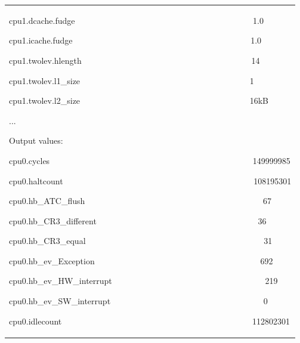\documentclass[a4paper]{article}
\begin{document}
\begin{flushleft}
\begin{tiny}
\begin{supertabular}{|m{6.34626in}|}
{\ttfamily cpu1.dcache.fudge
\ \ \ \ \ \ \ \ \ \ \ \ \ \ \ \ \ \ \ \ \ \ \ \ \ \ \ \ \ \ \ \ \ \ \ \ \ \ \ \ \ \ 1.0}

{\ttfamily cpu1.icache.fudge
\ \ \ \ \ \ \ \ \ \ \ \ \ \ \ \ \ \ \ \ \ \ \ \ \ \ \ \ \ \ \ \ \ \ \ \ \ \ \ \ \ \ 1.0}

{\ttfamily cpu1.twolev.hlength
\ \ \ \ \ \ \ \ \ \ \ \ \ \ \ \ \ \ \ \ \ \ \ \ \ \ \ \ \ \ \ \ \ \ \ \ \ \ \ \ 14}

{\ttfamily cpu1.twolev.l1\_size
\ \ \ \ \ \ \ \ \ \ \ \ \ \ \ \ \ \ \ \ \ \ \ \ \ \ \ \ \ \ \ \ \ \ \ \ \ \ \ \ 1}

{\ttfamily cpu1.twolev.l2\_size
\ \ \ \ \ \ \ \ \ \ \ \ \ \ \ \ \ \ \ \ \ \ \ \ \ \ \ \ \ \ \ \ \ \ \ \ \ \ \ \ 16kB}

{\ttfamily ...}

{\ttfamily Output values:}

{\ttfamily cpu0.cycles
\ \ \ \ \ \ \ \ \ \ \ \ \ \ \ \ \ \ \ \ \ \ \ \ \ \ \ \ \ \ \ \ \ \ \ \ \ \ \ \ \ \ \ \ \ \ \ \ 149999985}

{\ttfamily cpu0.haltcount
\ \ \ \ \ \ \ \ \ \ \ \ \ \ \ \ \ \ \ \ \ \ \ \ \ \ \ \ \ \ \ \ \ \ \ \ \ \ \ \ \ \ \ \ \ 108195301}

{\ttfamily cpu0.hb\_ATC\_flush
\ \ \ \ \ \ \ \ \ \ \ \ \ \ \ \ \ \ \ \ \ \ \ \ \ \ \ \ \ \ \ \ \ \ \ \ \ \ \ \ \ \ 67}

{\ttfamily cpu0.hb\_CR3\_different
\ \ \ \ \ \ \ \ \ \ \ \ \ \ \ \ \ \ \ \ \ \ \ \ \ \ \ \ \ \ \ \ \ \ \ \ \ \ 36}

{\ttfamily cpu0.hb\_CR3\_equal
\ \ \ \ \ \ \ \ \ \ \ \ \ \ \ \ \ \ \ \ \ \ \ \ \ \ \ \ \ \ \ \ \ \ \ \ \ \ \ \ \ \ 31}

{\ttfamily cpu0.hb\_ev\_Exception
\ \ \ \ \ \ \ \ \ \ \ \ \ \ \ \ \ \ \ \ \ \ \ \ \ \ \ \ \ \ \ \ \ \ \ \ \ \ \ 692}

{\ttfamily cpu0.hb\_ev\_HW\_interrupt
\ \ \ \ \ \ \ \ \ \ \ \ \ \ \ \ \ \ \ \ \ \ \ \ \ \ \ \ \ \ \ \ \ \ \ \ 219}

{\ttfamily cpu0.hb\_ev\_SW\_interrupt
\ \ \ \ \ \ \ \ \ \ \ \ \ \ \ \ \ \ \ \ \ \ \ \ \ \ \ \ \ \ \ \ \ \ \ \ 0}

{\ttfamily cpu0.idlecount
\ \ \ \ \ \ \ \ \ \ \ \ \ \ \ \ \ \ \ \ \ \ \ \ \ \ \ \ \ \ \ \ \ \ \ \ \ \ \ \ \ \ \ \ \ 112802301}


\end{supertabular}
\end{tiny}
\end{flushleft}
\end{document}
